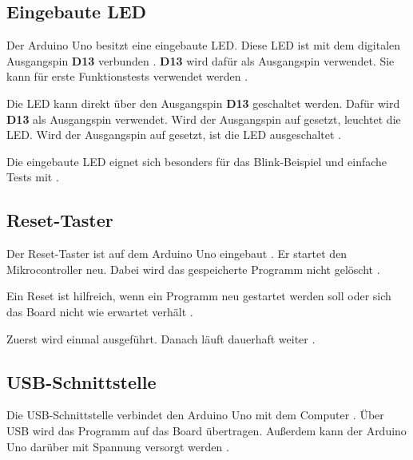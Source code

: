 \subsection{Eingebaute LED}



Der Arduino Uno besitzt eine eingebaute LED. Diese LED ist mit dem digitalen Ausgangspin \textbf{D13} verbunden \cite{arduino:uno-components}. \textbf{D13} wird dafür als Ausgangspin verwendet. Sie kann für erste Funktionstests verwendet werden \cite{arduino:uno-r3}.




Die LED kann direkt über den Ausgangspin \textbf{D13} geschaltet werden. Dafür wird \textbf{D13} als Ausgangspin verwendet. Wird der Ausgangspin auf  gesetzt, leuchtet die LED. Wird der Ausgangspin auf  gesetzt, ist die LED ausgeschaltet \cite{arduino_digitalwrite}.

Die eingebaute LED eignet sich besonders für das Blink-Beispiel und einfache Tests mit  \cite{arduino_digitalwrite}.




\subsection{Reset-Taster}



Der Reset-Taster ist auf dem Arduino Uno eingebaut \cite{arduino:uno-r3}. Er startet den Mikrocontroller neu. Dabei wird das gespeicherte Programm nicht gelöscht \cite{arduino:uno-components}.

Ein Reset ist hilfreich, wenn ein Programm neu gestartet werden soll oder sich das Board nicht wie erwartet verhält \cite{arduino:uno-components}.

Zuerst wird  einmal ausgeführt. Danach läuft  dauerhaft weiter \cite{arduino:language-reference}.


\subsection{USB-Schnittstelle}



Die USB-Schnittstelle verbindet den Arduino Uno mit dem Computer \cite{arduino:uno-components}. Über USB wird das Programm auf das Board übertragen. Außerdem kann der Arduino Uno darüber mit Spannung versorgt werden \cite{arduino:uno-datasheet}.


